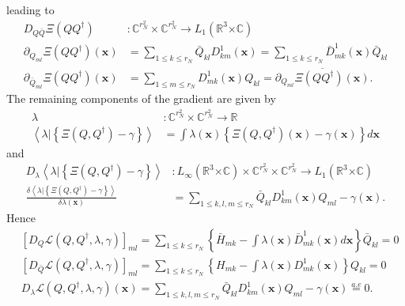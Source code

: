 \documentclass[aps,preprint]{revtex4}%
\begin{document}
leading to
\begin{align}
D_{Q\bar{Q}}\Xi\left(  QQ^{\dagger}\right)   &  :\mathbb{C}^{r_{N}^{2}}%
\times\mathbb{C}^{r_{N}^{2}}\rightarrow L_{1}\left(  \mathbb{R}^{3}%
\mathbb{\times C}\right) \nonumber\\
\partial_{Q_{ml}}\Xi\left(  QQ^{\dagger}\right)  \left(  \mathbf{x}\right)
&  =\sum_{1\leq k\leq r_{N}}\bar{Q}_{kl}D_{km}^{1}\left(  \mathbf{x}\right)
=\sum_{1\leq k\leq r_{N}}\bar{D}_{mk}^{1}\left(  \mathbf{x}\right)  \bar
{Q}_{kl}\nonumber\\
\partial_{\bar{Q}_{ml}}\Xi\left(  QQ^{\dagger}\right)  \left(  \mathbf{x}%
\right)   &  =\sum_{1\leq m\leq r_{N}}D_{mk}^{1}\left(  \mathbf{x}\right)
Q_{kl}=\overline{\partial_{Q_{ml}}\Xi\left(  QQ^{\dagger}\right)  \left(
\mathbf{x}\right)  }.
\end{align}
The remaining components of the gradient are given by
\begin{align}
\lambda &  :\mathbb{C}^{r_{N}^{2}}\times\mathbb{C}^{r_{N}^{2}}\rightarrow
\mathbb{R}\nonumber\\
\left\langle \left.  \lambda\right\vert \left\{  \Xi\left(  Q,Q^{\dagger
}\right)  -\gamma\right\}  \right\rangle  &  =\int\lambda\left(
\mathbf{x}\right)  \left\{  \Xi\left(  Q,Q^{\dagger}\right)  \left(
\mathbf{x}\right)  -\gamma\left(  \mathbf{x}\right)  \right\}  d\mathbf{x}%
\end{align}
and
\begin{align}
D_{\lambda}\left\langle \left.  \lambda\right\vert \left\{  \Xi\left(
Q,Q^{\dagger}\right)  -\gamma\right\}  \right\rangle  &  :L_{\infty}\left(
\mathbb{R}^{3}\mathbb{\times C}\right)  \times\mathbb{C}^{r_{N}^{2}}%
\times\mathbb{C}^{r_{N}^{2}}\rightarrow L_{1}\left(  \mathbb{R}^{3}%
\mathbb{\times C}\right) \nonumber\\
\frac{\delta\left\langle \left.  \lambda\right\vert \left\{  \Xi\left(
Q,Q^{\dagger}\right)  -\gamma\right\}  \right\rangle }{\delta\lambda\left(
\mathbf{x}\right)  }  &  =\sum_{1\leq k,l,m\leq r_{N}}\bar{Q}_{kl}D_{km}%
^{1}\left(  \mathbf{x}\right)  Q_{ml}-\gamma\left(  \mathbf{x}\right)  .
\end{align}
Hence
\begin{align}
&  \left[  D_{Q}\mathcal{L}\left(  Q,Q^{\dagger},\lambda,\gamma\right)
\right]  _{ml}=\sum_{1\leq k\leq r_{N}}\left\{  \bar{H}_{mk}-\int
\lambda\left(  \mathbf{x}\right)  \bar{D}_{mk}^{1}\left(  \mathbf{x}\right)
d\mathbf{x}\right\}  \bar{Q}_{kl}=0\nonumber\\
&  \left[  D_{\bar{Q}}\mathcal{L}\left(  Q,Q^{\dagger},\lambda,\gamma\right)
\right]  _{ml}=\sum_{1\leq k\leq r_{N}}\left\{  H_{mk}-\int\lambda\left(
\mathbf{x}\right)  D_{mk}^{1}\left(  \mathbf{x}\right)  \right\}
Q_{kl}=0\nonumber\\
&  D_{\lambda}\mathcal{L}\left(  Q,Q^{\dagger},\lambda,\gamma\right)  \left(
\mathbf{x}\right)  =\sum_{1\leq k,l,m\leq r_{N}}\bar{Q}_{kl}D_{km}^{1}\left(
\mathbf{x}\right)  Q_{ml}-\gamma\left(  \mathbf{x}\right)  \overset{a.e}{=}0.
\end{align}
\end{document}
